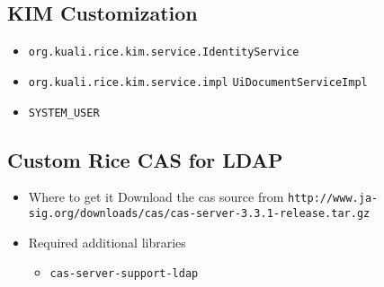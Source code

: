 \documentclass[12pt,notitlepage]{article}
\begin{document}
\begin{s5presentation}
  \W \begin{s5slide}
    \W \section{KIM Customization}
    \begin{itemize}
      \item \verb|org.kuali.rice.kim.service.IdentityService|
      \item \verb|org.kuali.rice.kim.service.impl|
        \verb|UiDocumentServiceImpl|
      \item \verb|SYSTEM_USER|
    \end{itemize}
    \W \end {s5slide}

  \W \begin{s5slide}
    \W \section{Custom Rice CAS for LDAP}
    \begin{itemize}
      \item Where to get it
        Download the cas source from 
        \verb|http://www.ja-sig.org/downloads/cas/cas-server-3.3.1-release.tar.gz|
      \item Required additional libraries
        \begin{itemize}
          \item \verb|cas-server-support-ldap|
        \end{itemize}
    \end{itemize}
    \W \end {s5slide}



\end{s5presentation}
\end{document}
